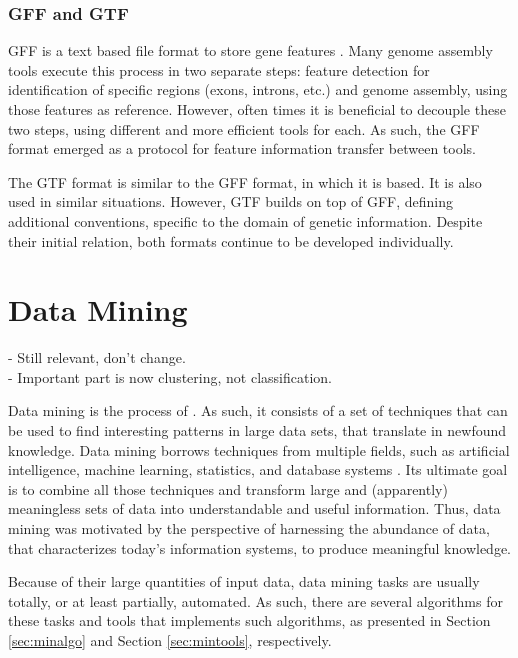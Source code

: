 \subsubsection*{GFF and GTF}

GFF is a text based file format to store gene features \cite{sanger11}. Many
genome assembly tools execute this process in two separate steps: feature
detection for identification of specific regions (exons, introns, etc.) and
genome assembly, using those features as reference. However, often times it is
beneficial to decouple these two steps, using different and more efficient tools
for each. As such, the GFF format emerged as a protocol for feature information
transfer between tools.

The GTF format is similar to the GFF format, in which it is based. It is also
used in similar situations. However, GTF builds on top of GFF, defining
additional conventions, specific to the domain of genetic information. Despite
their initial relation, both formats continue to be developed individually.

\section{Data Mining}\label{sec:mlearning}

\begin{Notes}
- Still relevant, don't change.\\
- Important part is now clustering, not classification.
\end{Notes}

Data mining is the process of  \cite[p. 5]{han2006data}. As such, it consists of a
set of techniques that can be used to find interesting patterns in large data
sets, that translate in newfound knowledge. Data mining borrows techniques from
multiple fields, such as artificial intelligence, machine learning, statistics,
and database systems \cite{Chakrabarti2012}. Its ultimate goal is to combine all
those techniques and transform large and (apparently) meaningless sets of data
into understandable and useful information. Thus, data mining was motivated by
the perspective of harnessing the abundance of data, that characterizes today's
information systems, to produce meaningful knowledge.

Because of their large quantities of input data, data mining tasks are usually
totally, or at least partially, automated. As such, there are several algorithms
for these tasks and tools that implements such algorithms, as presented in
Section \ref{sec:minalgo} and Section \ref{sec:mintools}, respectively.

